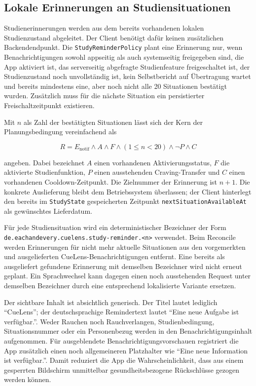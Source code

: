 \begin{neu}
\subsection{Lokale Erinnerungen an Studiensituationen}

Studienerinnerungen werden aus dem bereits vorhandenen lokalen Studienzustand abgeleitet. Der Client benötigt dafür keinen zusätzlichen Backendendpunkt. Die \texttt{StudyReminderPolicy} plant eine Erinnerung nur, wenn Benachrichtigungen sowohl appseitig als auch systemseitig freigegeben sind, die App aktiviert ist, das serverseitig abgefragte Studienfeature freigeschaltet ist, der Studienzustand noch unvollständig ist, kein Selbstbericht auf Übertragung wartet und bereits mindestens eine, aber noch nicht alle 20 Situationen bestätigt wurden. Zusätzlich muss für die nächste Situation ein persistierter Freischaltzeitpunkt existieren.

Mit \(n\) als Zahl der bestätigten Situationen lässt sich der Kern der Planungsbedingung vereinfachend als

\[
R = E_{\mathrm{notif}}
\land A
\land F
\land (1 \leq n < 20)
\land \neg P
\land C
\]

angeben. Dabei bezeichnet \(A\) einen vorhandenen Aktivierungsstatus, \(F\) die aktivierte Studienfunktion, \(P\) einen ausstehenden Craving-Transfer und \(C\) einen vorhandenen Cooldown-Zeitpunkt. Die Zielnummer der Erinnerung ist \(n+1\). Die konkrete Auslieferung bleibt dem Betriebssystem überlassen; der Client hinterlegt den bereits im \texttt{StudyState} gespeicherten Zeitpunkt \texttt{nextSituationAvailableAt} als gewünschtes Lieferdatum.

Für jede Studiensituation wird ein deterministischer Bezeichner der Form \texttt{de.eachandevery.cuelens.study-reminder.<n>} verwendet. Beim Reconcile werden Erinnerungen für nicht mehr aktuelle Situationen aus den vorgemerkten und ausgelieferten CueLens-Benachrichtigungen entfernt. Eine bereits als ausgeliefert gefundene Erinnerung mit demselben Bezeichner wird nicht erneut geplant. Ein Sprachwechsel kann dagegen einen noch ausstehenden Request unter demselben Bezeichner durch eine entsprechend lokalisierte Variante ersetzen.

Der sichtbare Inhalt ist absichtlich generisch. Der Titel lautet lediglich \enquote{CueLens}; der deutschsprachige Remindertext lautet \enquote{Eine neue Aufgabe ist verfügbar.}. Weder Rauchen noch Rauchverlangen, Studienbedingung, Situationsnummer oder ein Personenbezug werden in den Benachrichtigungsinhalt aufgenommen. Für ausgeblendete Benachrichtigungsvorschauen registriert die App zusätzlich einen noch allgemeineren Platzhalter wie \enquote{Eine neue Information ist verfügbar.}. Damit reduziert die App die Wahrscheinlichkeit, dass aus einem gesperrten Bildschirm unmittelbar gesundheitsbezogene Rückschlüsse gezogen werden können.


\end{neu}
